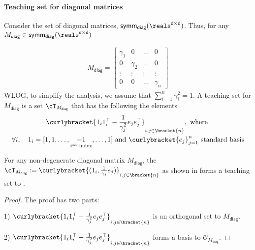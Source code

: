 \paragraph{Teaching set for diagonal matrices} Consider the set of diagonal matrices, $\sf symm_{diag}(\reals^{d \times d})$. Thus, for any $M_{\mathsf{diag}} \in \sf symm_{diag}(\reals^{d \times d})$

    \begin{align*}
    M_{\mathsf{diag}} = \begin{bmatrix}
  \gamma_1 & 0& \ldots & 0 \\
  0 & \gamma_2& \ldots & 0\\
  \vdots & \vdots & \vdots & \vdots\\
  0& 0& \ldots & \gamma_n
\end{bmatrix}
\end{align*}
WLOG, to simplify the analysis, we assume that $\sum_{i=1}^n \gamma_i^2 = 1$.
A teaching set for $M_{\mathsf{diag}}$ is a set $\cT_{M_{\mathsf{diag}}}$ that has the following the elements
\begin{subequations}\label{eq: diagset}
\begin{gather}
    \curlybracket{1_i1_i^{\top} - \frac{1}{\gamma^2_j}e_je_j^{\top}}_{i,j \in \bracket{n} }, \textnormal{ where } \\
    \forall i,\quad 1_i = [1,1,\ldots,\underset{i^{th} \textnormal{ index}}{-1},\ldots,1] \textnormal{ and } \curlybracket{e_j}_{j=1}^n \textnormal{ standard basis}
\end{gather}
\end{subequations}


\begin{lemma}
    For any non-degenerate diagonal matrix $M_{\mathsf{diag}}$, the $\cT_{M_{\mathsf{diag}}} := \curlybracket{(1_i,\frac{1}{\gamma_j}e_j)}_{i,j \in \bracket{n}}$ as shown in  forms a teaching set to . 
\end{lemma}
\begin{proof}
    The proof has two parts:

    1) $\curlybracket{1_i1_i^{\top} - \frac{1}{\gamma^2_j}e_je_j^{\top}}_{i,j \in \bracket{n} }$ is an orthogonal set to $M_{\mathsf{diag}}$.

    2) $\curlybracket{1_i1_i^{\top} - \frac{1}{\gamma^2_j}e_je_j^{\top}}_{i,j \in \bracket{n} }$ forms a basis to $\mathcal{O}_{M_{\mathsf{diag}}}$.
\end{proof}

